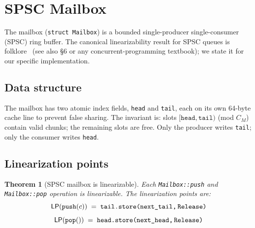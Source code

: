 \documentclass[11pt,a4paper]{report}
\newtheorem{theorem}{Theorem}[section]
\newcommand{\LP}[1]{\mathsf{LP}(#1)}
\newcommand{\code}[1]{\texttt{#1}}
\begin{document}
\section{SPSC Mailbox}
\label{sec:spsc}

The mailbox (\code{struct Mailbox}) is a bounded single-producer
single-consumer (SPSC) ring buffer.  The canonical linearizability
result for SPSC queues is folklore~\cite{treiber1986} (see also \cite{boehm2008}
\S{}6 or any concurrent-programming textbook); we state it for
our specific implementation.

\subsection{Data structure}

The mailbox has two atomic index fields, \code{head} and
\code{tail}, each on its own 64-byte cache line to prevent false
sharing.  The invariant is: slots $[\code{head}, \code{tail})$
(mod $C_M$) contain valid chunks; the remaining slots are free.
Only the producer writes \code{tail}; only the consumer writes
\code{head}.

\subsection{Linearization points}

\begin{theorem}[SPSC mailbox is linearizable]
\label{thm:spsc}
Each \code{Mailbox::push} and \code{Mailbox::pop} operation is
linearizable.  The linearization points are:
\[
  \LP{\code{push}(c)}    \;=\; \code{tail.store(next\_tail,\,Release)}
\]
\[
  \LP{\code{pop}()}      \;=\; \code{head.store(next\_head,\,Release)}
\]
\end{theorem}
\end{document}

